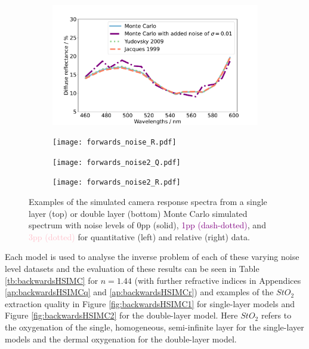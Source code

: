 \begin{figure}[h!]
    \centering
    \begin{subfigure}{0.49\textwidth}
        \includegraphics[width=\textwidth]{forwards_noise_Q.pdf}
        \caption{}
        \label{fig:egforwardsnoiseMCQ}
    \end{subfigure}
    \begin{subfigure}{0.49\textwidth}
        \texttt{[image: forwards\_noise\_R.pdf]}
        \caption{}
        \label{fig:egforwardsnoiseMCR}
    \end{subfigure}
    \begin{subfigure}{0.49\textwidth}
        \texttt{[image: forwards\_noise2\_Q.pdf]}
        \caption{}
        \label{fig:egforwards2noiseMCQ}
    \end{subfigure}
    \begin{subfigure}{0.49\textwidth}
        \texttt{[image: forwards\_noise2\_R.pdf]}
        \caption{}
        \label{fig:egforwards2noiseMCR}
    \end{subfigure}
    \caption{Examples of the simulated camera response spectra from a single layer (top) or double layer (bottom) Monte Carlo simulated spectrum with noise levels of \textcolor{MyBlue}{0pp (solid)}, \textcolor{purple}{1pp (dash-dotted)}, and \textcolor{pink}{3pp (dotted)} for quantitative (left) and relative (right) data.}
    \label{fig:forwardsMCnoise}
\end{figure}

Each model is used to analyse the inverse problem of each of these varying noise level datasets and the evaluation of these results can be seen in Table \ref{tb:backwardsHSIMC} for $n=1.44$ (with further refractive indices in Appendices \ref{ap:backwardsHSIMCq} and \ref{ap:backwardsHSIMCr}) and examples of the $StO_2$ extraction quality in Figure \ref{fig:backwardsHSIMC1} for single-layer models and Figure \ref{fig:backwardsHSIMC2} for the double-layer model. Here $StO_2$ refers to the oxygenation of the single, homogeneous, semi-infinite layer for the single-layer models and the dermal oxygenation for the double-layer model. 


